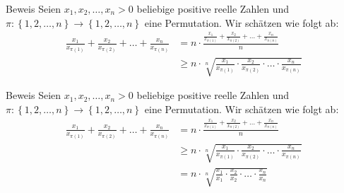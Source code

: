 \documentclass[10pt]{beamer}
\begin{document}
\begin{frame}{Beweis}
    Seien \( x_{1}, x_{2}, \ldots, x_{n} > 0 \) beliebige positive reelle Zahlen und \( \pi: \left\{ 1, 2, \ldots, n \right\} \to \left\{ 1, 2, \ldots, n \right\} \) eine Permutation. Wir schätzen wie folgt ab:
    \begin{align*}
        \frac{x_{1}}{x_{\pi\left( 1 \right)}} + \frac{x_{2}}{x_{\pi\left( 2 \right)}} + \ldots + \frac{x_{n}}{x_{\pi\left( n \right)}}
        & = n \cdot \frac{\frac{x_{1}}{x_{\pi\left( 1 \right)}} + \frac{x_{2}}{x_{\pi\left( 2 \right)}} + \ldots + \frac{x_{n}}{x_{\pi\left( n \right)}}}{n} \\
        & \geq n \cdot \sqrt[n]{\frac{x_{1}}{x_{\pi\left( 1 \right)}} \cdot \frac{x_{2}}{x_{\pi\left( 2 \right)}} \cdot \ldots \cdot \frac{x_{n}}{x_{\pi\left( n \right)}}}
    \end{align*}
\end{frame}



\begin{frame}{Beweis}
    Seien \( x_{1}, x_{2}, \ldots, x_{n} > 0 \) beliebige positive reelle Zahlen und \( \pi: \left\{ 1, 2, \ldots, n \right\} \to \left\{ 1, 2, \ldots, n \right\} \) eine Permutation. Wir schätzen wie folgt ab:
    \begin{align*}
        \frac{x_{1}}{x_{\pi\left( 1 \right)}} + \frac{x_{2}}{x_{\pi\left( 2 \right)}} + \ldots + \frac{x_{n}}{x_{\pi\left( n \right)}}
        & = n \cdot \frac{\frac{x_{1}}{x_{\pi\left( 1 \right)}} + \frac{x_{2}}{x_{\pi\left( 2 \right)}} + \ldots + \frac{x_{n}}{x_{\pi\left( n \right)}}}{n} \\
        & \geq n \cdot \sqrt[n]{\frac{x_{1}}{x_{\pi\left( 1 \right)}} \cdot \frac{x_{2}}{x_{\pi\left( 2 \right)}} \cdot \ldots \cdot \frac{x_{n}}{x_{\pi\left( n \right)}}} \\
        & = n \cdot \sqrt[n]{\frac{x_{1}}{x_{1}} \cdot \frac{x_{2}}{x_{2}} \cdot \ldots \cdot \frac{x_{n}}{x_{n}}}
    \end{align*}
\end{frame}
\end{document}
